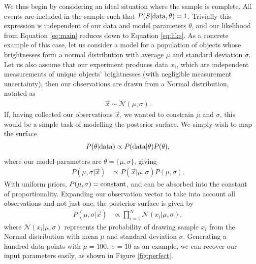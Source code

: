 \documentclass[a4paper,fleqn,usenatbib]{mnras}
\begin{document}
We thus begin by considering an ideal situation where the sample is complete.  All events are included in the sample such that $P(S | {\rm data}, \theta)=1$.  Trivially this expression is independent of our data and model parameters $\theta$, and our likelihood from Equation \eqref{eq:main} reduces down to Equation \eqref{eq:like}. As a concrete example of this case, let us consider a model for a population of objects whose brightnesses form a normal distribution with average $\mu$ and standard deviation $\sigma$. Let us also assume that our experiment produces data $x_i$, which are independent measurements of unique objects' brightnesses (with negligible measurement uncertainty), then our observations are drawn from a Normal distribution, notated as
\begin{align}
\vec{x} \sim \mathcal{N}(\mu,\sigma).
\end{align}
If, having collected our observations $\vec{x}$, we wanted to constrain $\mu$ and $\sigma$, this would be a simple task of modelling the posterior surface. We simply wish to map the surface
\begin{align}
P(\theta | {\rm data}) \propto P({\rm data} | \theta) P(\theta),
\end{align}
where our model parameters are $\theta = \lbrace \mu, \sigma \rbrace$, giving
\begin{align}
P(\mu,\sigma| \vec{x}) &\propto P(\vec{x} | \mu, \sigma) P(\mu, \sigma).
\end{align}
With uniform priors, $P(\mu,\sigma) = {\rm constant}$, and can be absorbed into the constant of proportionality. Expanding our observation vector to take into account all observations and not just one, the posterior surface is given by
\begin{align}
P(\mu,\sigma| \vec{x}) &\propto \prod_{i=1}^N \mathcal{N}(x_i | \mu, \sigma), \label{eq:prod}
\end{align}
where $\mathcal{N}(x_i|\mu,\sigma)$ represents the probability of drawing sample $x_i$ from the Normal distribution with mean $\mu$ and standard deviation $\sigma$. Generating a hundred data points with $\mu=100,\ \sigma=10$ as an example, we can recover our input parameters easily, as shown in Figure \ref{fig:perfect}.
\end{document}
